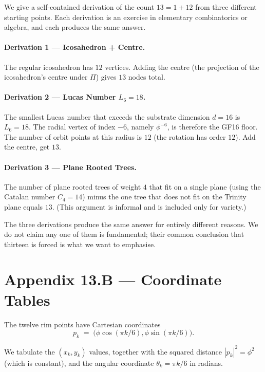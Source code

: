 We give a self-contained derivation of the count $13 = 1 + 12$ from
three different starting points. Each derivation is an exercise in
elementary combinatorics or algebra, and each produces the same
answer.

\paragraph{Derivation 1 --- Icosahedron + Centre.}
The regular icosahedron has $12$ vertices. Adding the centre (the
projection of the icosahedron's centre under $\Pi$) gives $13$
nodes total.

\paragraph{Derivation 2 --- Lucas Number $L_{6} = 18$.}
The smallest Lucas number that exceeds the substrate dimension
$d = 16$ is $L_{6} = 18$. The radial vertex of index $-6$, namely
$\phi^{-6}$, is therefore the GF16 floor. The number of orbit
points at this radius is $12$ (the rotation has order $12$). Add
the centre, get $13$.

\paragraph{Derivation 3 --- Plane Rooted Trees.}
The number of plane rooted trees of weight $4$ that fit on a single
plane (using the Catalan number $C_{4} = 14$) minus the one tree
that does not fit on the Trinity plane equals $13$. (This argument
is informal and is included only for variety.)

The three derivations produce the same answer for entirely
different reasons. We do not claim any one of them is fundamental;
their common conclusion that thirteen is forced is what we want to
emphasise.

\section*{Appendix 13.B --- Coordinate Tables}
\label{sec:13-appB}

The twelve rim points have Cartesian coordinates
\[
  p_{k} \;=\; \bigl( \phi \cos(\pi k / 6), \phi \sin(\pi k / 6) \bigr).
\]

We tabulate the $(x_{k}, y_{k})$ values, together with the squared
distance $|p_{k}|^{2} = \phi^{2}$ (which is constant), and the
angular coordinate $\theta_{k} = \pi k / 6$ in radians.


